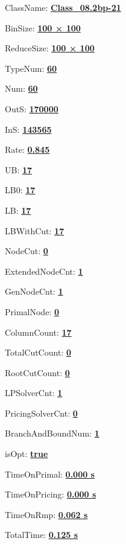 \documentclass[11pt]{article}
\begin{document}
\pagestyle{empty}


ClassName: \underline{\textbf{Class_08.2bp-21}}
\par
BinSize: \underline{\textbf{100 × 100}}
\par
ReduceSize: \underline{\textbf{100 × 100}}
\par
TypeNum: \underline{\textbf{60}}
\par
Num: \underline{\textbf{60}}
\par
OutS: \underline{\textbf{170000}}
\par
InS: \underline{\textbf{143565}}
\par
Rate: \underline{\textbf{0.845}}
\par
UB: \underline{\textbf{17}}
\par
LB0: \underline{\textbf{17}}
\par
LB: \underline{\textbf{17}}
\par
LBWithCut: \underline{\textbf{17}}
\par
NodeCut: \underline{\textbf{0}}
\par
ExtendedNodeCnt: \underline{\textbf{1}}
\par
GenNodeCnt: \underline{\textbf{1}}
\par
PrimalNode: \underline{\textbf{0}}
\par
ColumnCount: \underline{\textbf{17}}
\par
TotalCutCount: \underline{\textbf{0}}
\par
RootCutCount: \underline{\textbf{0}}
\par
LPSolverCnt: \underline{\textbf{1}}
\par
PricingSolverCnt: \underline{\textbf{0}}
\par
BranchAndBoundNum: \underline{\textbf{1}}
\par
isOpt: \underline{\textbf{true}}
\par
TimeOnPrimal: \underline{\textbf{0.000 s}}
\par
TimeOnPricing: \underline{\textbf{0.000 s}}
\par
TimeOnRmp: \underline{\textbf{0.062 s}}
\par
TotalTime: \underline{\textbf{0.125 s}}
\par
\newpage


\end{document}
